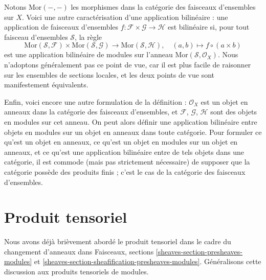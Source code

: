 \medskip\noindent
Notons $\text{Mor}( - , - )$ les morphismes dans la catégorie des faisceaux
d'ensembles sur $X$. Voici une autre caractérisation d'une application bilinéaire :
une application de faisceaux d'ensembles
$f : \mathcal{F} \times \mathcal{G} \to \mathcal{H}$
est bilinéaire si, pour tout faisceau d'ensembles $\mathcal{S}$, la règle
$$
\text{Mor}(\mathcal{S}, \mathcal{F}) \times
\text{Mor}(\mathcal{S}, \mathcal{G}) \to
\text{Mor}(\mathcal{S}, \mathcal{H}),\quad
(a, b) \mapsto f \circ (a \times b)
$$
est une application bilinéaire de modules sur l'anneau
$\text{Mor}(\mathcal{S}, \mathcal{O}_X)$.
Nous n'adoptons généralement pas ce point de vue, car il est plus facile de raisonner sur les
ensembles de sections locales, et les deux points de vue sont manifestement équivalents.

\medskip\noindent
Enfin, voici encore une autre formulation de la définition :
$\mathcal{O}_X$ est un objet en anneaux dans la catégorie des faisceaux d'ensembles,
et $\mathcal{F}$, $\mathcal{G}$, $\mathcal{H}$ sont des objets en modules
sur cet anneau. On peut alors définir une application bilinéaire entre objets en modules
sur un objet en anneaux dans toute catégorie.
Pour formuler ce qu'est un objet en anneaux, ce qu'est un objet en modules
sur un objet en anneaux, et ce qu'est une application bilinéaire entre de tels objets dans une
catégorie, il est commode (mais pas strictement nécessaire)
de supposer que la catégorie possède des produits finis ;
c'est le cas de la catégorie des faisceaux d'ensembles.







\section{Produit tensoriel}
\label{section-tensor-product}

\noindent
Nous avons déjà brièvement abordé le produit tensoriel dans le cadre
du changement d'anneaux dans Faisceaux, sections
\ref{sheaves-section-presheaves-modules} et
\ref{sheaves-section-sheafification-presheaves-modules}.
Généralisons cette discussion aux produits tensoriels de modules.

